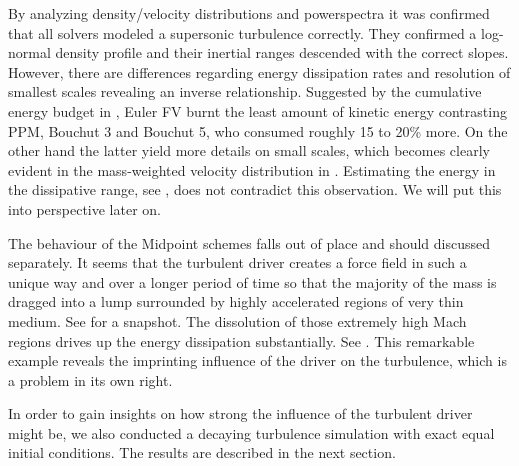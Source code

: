 By analyzing density/velocity distributions and powerspectra it was confirmed
that all solvers modeled a supersonic turbulence correctly. They confirmed a
log-normal density profile and their inertial ranges descended with the correct
slopes. However, there are differences regarding energy dissipation rates and
resolution of smallest scales revealing an inverse relationship. Suggested by
the cumulative energy budget in
, Euler FV burnt the
least amount of kinetic energy contrasting PPM, Bouchut 3 and Bouchut 5, who
consumed roughly 15 to 20\% more. On the other hand the latter yield more
details on small scales, which becomes clearly evident in the mass-weighted
velocity distribution in .
Estimating the energy in the dissipative range, see , does
not contradict this observation. We will put this into perspective later on.

The behaviour of the Midpoint schemes falls out of place and should discussed
separately. It seems that the turbulent driver creates a force field in such a
unique way and over a longer period of time so that the majority of the mass is
dragged into a lump surrounded by highly accelerated regions of very thin
medium. See  for a snapshot.
The dissolution of those extremely high Mach regions drives up the energy
dissipation substantially. See
.  This remarkable example
reveals the imprinting influence of the driver on the turbulence, which is
a problem in its own right.

In order to gain insights on how strong the influence of the turbulent driver
might be, we also conducted a decaying turbulence simulation with exact equal
initial conditions. The results are described in the next section.
